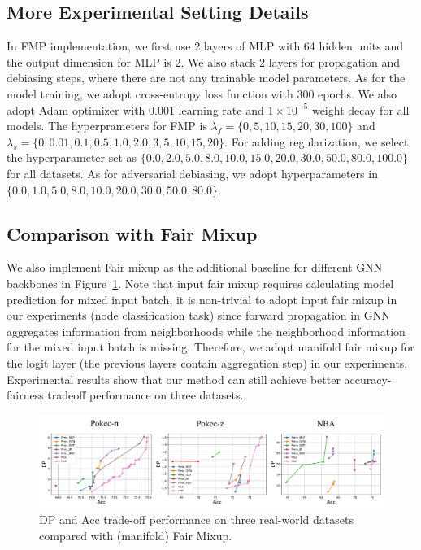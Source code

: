 \documentclass[letterpaper]{article} %
\theoremstyle{plain}
\theoremstyle{definition}
\theoremstyle{remark}
\begin{document}
\subsection{More Experimental Setting Details}\label{app:exp_detail}
In FMP implementation, we first use 2 layers of MLP with 64 hidden units and the output dimension for MLP is 2. We also stack 2 layers for propagation and debiasing steps, where there are not any trainable model parameters. As for the model training, we adopt cross-entropy loss function with 300 epochs. We also adopt Adam optimizer with $0.001$ learning rate and $1\times 10^{-5}$
weight decay for all models. The hyperprameters for FMP is $\lambda_{f}=\{0, 5, 10, 15, 20, 30, 100\}$ and $\lambda_{s}=\{0, 0.01, 0.1, 0.5, 1.0, 2.0, 3, 5, 10, 15, 20\}$. For adding regularization, we select the hyperparameter set as $\{0.0, 2.0, 5.0, 8.0, 10.0, 15.0, 20.0, 30.0, 50.0, 80.0, 100.0\}$ for all datasets. As for adversarial debiasing, we adopt hyperparameters in $\{0.0, 1.0, 5.0, 8.0, 10.0, 20.0, 30.0, 50.0, 80.0\}$.


\subsection{Comparison with Fair Mixup}\label{app:fairmixup}

We also implement Fair mixup \citep{chuang2021fair} as the additional baseline for different GNN backbones in Figure~\ref{fig:tradeoff_fairmixup}. Note that input fair mixup requires calculating model prediction for mixed input batch, it is non-trivial to adopt input fair mixup in our experiments (node classification task) since forward propagation in GNN  aggregates information from neighborhoods while the neighborhood information for the mixed input batch is missing. Therefore, we adopt manifold fair mixup for the logit layer (the previous layers contain aggregation step) in our experiments. Experimental results show that our method can still achieve better accuracy-fairness tradeoff performance on three datasets. 

\begin{figure}[t]
\centering
\includegraphics[width=0.99\linewidth]{Tradeoff_Fmix.pdf}

\caption{DP and Acc trade-off performance on three real-world datasets compared with (manifold) Fair Mixup.}
\label{fig:tradeoff_fairmixup}
\vspace{-5pt}
\end{figure}
\end{document}
